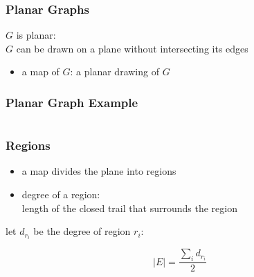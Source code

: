 \documentclass[dvipsnames]{beamer}
\begin{document}
\begin{frame}
  \frametitle{Planar Graphs}

  \begin{definition}
    $G$ is \alert{planar}:\\
    $G$ can be drawn on a plane without intersecting its edges
  \end{definition}

  \begin{itemize}
    \item a \alert{map} of $G$: a planar drawing of $G$
  \end{itemize}
\end{frame}

\begin{frame}
  \frametitle{Planar Graph Example}

  \begin{example}[$K_4$]
    \begin{columns}
      \begin{center}
      \end{center}

      \begin{center}
      \end{center}
    \end{columns}
  \end{example}
\end{frame}

\begin{frame}
  \frametitle{Regions}

  \begin{itemize}
    \item a map divides the plane into \alert{regions}
    \item degree of a region:\\
      length of the closed trail that surrounds the region
  \end{itemize}

  \pause
  \begin{theorem}
    let $d_{r_i}$ be the degree of region $r_i$:

    \[ |E| = \frac{\sum_i d_{r_i}}{2} \]
  \end{theorem}
\end{frame}
\end{document}

